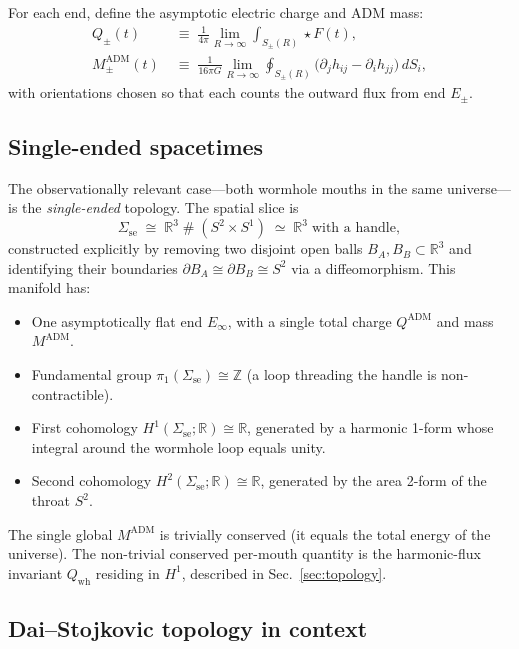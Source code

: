 \documentclass[aps,prd,onecolumn,nofootinbib,superscriptaddress]{revtex4-2}
\begin{document}
For each end, define the asymptotic electric charge and ADM mass:
\begin{align}
  Q_\pm(t) &\;\equiv\;
    \frac{1}{4\pi}\lim_{R\to\infty}\int_{S_\pm(R)}\star F(t),
    \label{eq:Qpm-def}\\
  M_\pm^{\mathrm{ADM}}(t) &\;\equiv\;
    \frac{1}{16\pi G}\lim_{R\to\infty}
    \oint_{S_\pm(R)}\!\big(\partial_j h_{ij}-\partial_i h_{jj}\big)\,dS_i,
    \label{eq:Mpm-def}
\end{align}
with orientations chosen so that each counts the outward flux from end $E_\pm$.

\subsection{Single-ended spacetimes}

The observationally relevant case---both wormhole mouths in the same universe---is
the \emph{single-ended} topology.  The spatial slice is
\begin{equation}
  \Sigma_{\mathrm{se}} \;\cong\; \mathbb{R}^3\;\#\;(S^2\times S^1)
  \;\simeq\; \mathbb{R}^3\;\text{with a handle},
\end{equation}
constructed explicitly by removing two disjoint open balls $B_A,B_B\subset\mathbb{R}^3$
and identifying their boundaries $\partial B_A\cong\partial B_B\cong S^2$ via
a diffeomorphism.  This manifold has:
\begin{itemize}
  \item One asymptotically flat end $E_\infty$, with a single total charge
    $Q^{\mathrm{ADM}}$ and mass $M^{\mathrm{ADM}}$.
  \item Fundamental group $\pi_1(\Sigma_{\mathrm{se}})\cong\mathbb{Z}$
    (a loop threading the handle is non-contractible).
  \item First cohomology $H^1(\Sigma_{\mathrm{se}};\mathbb{R})\cong\mathbb{R}$,
    generated by a harmonic 1-form whose integral around the wormhole loop
    equals unity.
  \item Second cohomology $H^2(\Sigma_{\mathrm{se}};\mathbb{R})\cong\mathbb{R}$,
    generated by the area 2-form of the throat $S^2$.
\end{itemize}

The single global $M^{\mathrm{ADM}}$ is trivially conserved (it equals the
total energy of the universe).  The non-trivial conserved per-mouth quantity is
the harmonic-flux invariant $Q_{\mathrm{wh}}$ residing in $H^1$, described in
Sec.~\ref{sec:topology}.

\subsection{Dai--Stojkovic topology in context}
\end{document}
